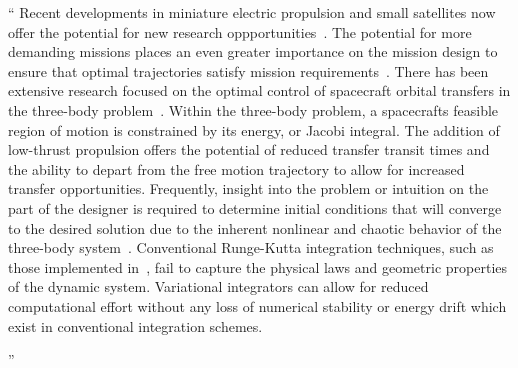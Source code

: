 \documentclass[11pt]{article}
\newenvironment{correction}{\begin{list}{}{\setlength{\leftmargin}{1cm}\setlength{\rightmargin}{1cm}}\vspace{\parsep}\item[]``}{''\end{list}}
\begin{document}
\begin{itemize}
\begin{correction}
            Recent developments in miniature electric propulsion and small satellites now offer the potential for new research oppportunities~\cite{folta2015,haque2013}.
            The potential for more demanding missions places an even greater importance on the mission design to ensure that optimal trajectories satisfy mission requirements~\cite{folta2015,koon2011,ross2006,gomez2001}. 
            There has been extensive research focused on the optimal control of spacecraft orbital transfers in the three-body problem~\cite{mingotti2011,grebow2011,koon2011,ross2006}. 
            Within the three-body problem, a spacecrafts feasible region of motion is constrained by its energy, or Jacobi integral.
            The addition of low-thrust propulsion offers the potential of reduced transfer transit times and the ability to depart from the free motion trajectory to allow for increased transfer opportunities.
            Frequently, insight into the problem or intuition on the part of the designer is required to determine initial conditions that will converge to the desired solution due to the inherent nonlinear and chaotic behavior of the three-body system~\cite{szebehely1967}.
            Conventional Runge-Kutta integration techniques, such as those implemented in~\cite{mingotti2011,grebow2011}, fail to capture the physical laws and geometric properties of the dynamic system.
            Variational integrators can allow for reduced computational effort without any loss of numerical stability or energy drift which exist in conventional integration schemes. 







\end{correction}
\end{itemize}
\end{document}
